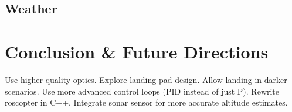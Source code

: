 \documentclass[10pt]{scrartcl} %
\begin{document}
\subsection{Weather}


\section{Conclusion \& Future Directions}

Use higher quality optics.
Explore landing pad design.
Allow landing in darker scenarios.
Use more advanced control loops (PID instead of just P).
Rewrite roscopter in C++.
Integrate sonar sensor for more accurate altitude estimates.
\end{document}
